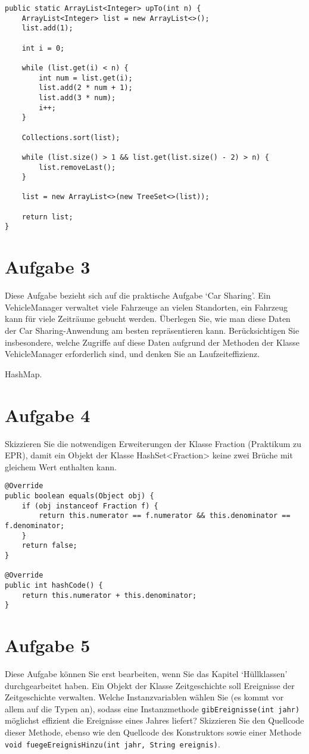 \begin{lstlisting}
public static ArrayList<Integer> upTo(int n) {
    ArrayList<Integer> list = new ArrayList<>();
    list.add(1);

    int i = 0;

    while (list.get(i) < n) {
        int num = list.get(i);
        list.add(2 * num + 1);
        list.add(3 * num);
        i++;
    }

    Collections.sort(list);

    while (list.size() > 1 && list.get(list.size() - 2) > n) {
        list.removeLast();
    }

    list = new ArrayList<>(new TreeSet<>(list));

    return list;
}
\end{lstlisting}

\section{Aufgabe 3}

Diese Aufgabe bezieht sich auf die praktische Aufgabe `Car Sharing'. Ein
VehicleManager verwaltet viele Fahrzeuge an vielen Standorten, ein Fahrzeug
kann für viele Zeiträume gebucht werden. Überlegen Sie, wie man diese Daten der
Car Sharing-Anwendung am besten repräsentieren kann. Berücksichtigen Sie
insbesondere, welche Zugriffe auf diese Daten aufgrund der Methoden der Klasse
VehicleManager erforderlich sind, und denken Sie an Laufzeiteffizienz.

HashMap.

\section{Aufgabe 4}
Skizzieren Sie die notwendigen Erweiterungen der Klasse Fraction (Praktikum zu
EPR), damit ein Objekt der Klasse HashSet<Fraction> keine zwei Brüche mit
gleichem Wert enthalten kann.

\begin{lstlisting}
@Override
public boolean equals(Object obj) {
    if (obj instanceof Fraction f) {
        return this.numerator == f.numerator && this.denominator == f.denominator;
    }
    return false;
}

@Override
public int hashCode() {
    return this.numerator + this.denominator;
}
\end{lstlisting}

\section{Aufgabe 5}
Diese Aufgabe können Sie erst bearbeiten, wenn Sie das Kapitel `Hüllklassen'
durchgearbeitet haben. Ein Objekt der Klasse Zeitgeschichte soll Ereignisse der
Zeitgeschichte verwalten. Welche Instanzvariablen wählen Sie (es kommt vor
allem auf die Typen an), sodass eine Instanzmethode
\lstinline{gibEreignisse(int jahr)} möglichst effizient die Ereignisse eines
Jahres liefert? Skizzieren Sie den Quellcode dieser Methode, ebenso wie den
Quellcode des Konstruktors sowie einer Methode 
\lstinline{void fuegeEreignisHinzu(int jahr, String ereignis)}.

